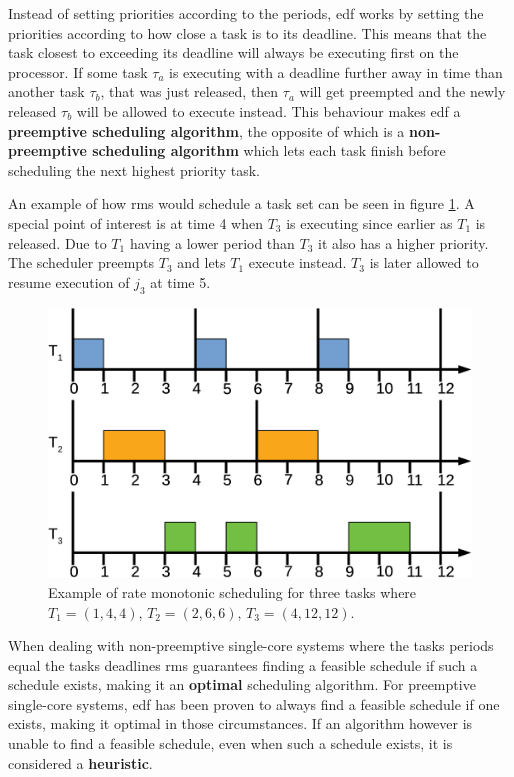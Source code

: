 \documentclass{kththesis}
\begin{document}
Instead of setting priorities according to the periods, \acrshort{edf} works by setting the
priorities according to how close a task is to its deadline. This means that the task closest to
exceeding its deadline will always be executing first on the processor. If some task $ \tau_a $ is
executing with a deadline further away in time than another task $ \tau_b $, that was just released,
then $ \tau_a $ will get preempted and the newly released $ \tau_b $ will be allowed to execute
instead. This behaviour makes \acrshort{edf} a \textbf{preemptive scheduling algorithm}, the
opposite of which is a \textbf{non-preemptive scheduling algorithm} which lets each task finish
before scheduling the next highest priority task.

An example of how \acrshort{rms} would schedule a task set can be seen in figure
\ref{fig:rate_monotonic_scheduling}. A special point of interest is at time 4 when $T_3$ is
executing since earlier as $T_1$ is released. Due to $T_1$ having a lower period than $T_3$ it also
has a higher priority. The scheduler preempts $T_3$ and lets $T_1$ execute instead. $T_3$ is later
allowed to resume execution of $j_3$ at time 5.

\begin{figure}

    \centering

    \includegraphics[width=0.8\linewidth]{images/rate-monotonic-scheduling.pdf}

    \caption{Example of rate monotonic scheduling for three tasks where $T_1=(1, 4, 4)$, $T_2=(2, 6,
    6)$, $T_3=(4, 12, 12)$.}

    \label{fig:rate_monotonic_scheduling}

\end{figure}

When dealing with non-preemptive single-core systems where the tasks periods equal the tasks
deadlines \acrshort{rms} guarantees finding a feasible schedule if such a schedule exists, making it
an \textbf{optimal} scheduling algorithm. For preemptive single-core systems, \acrshort{edf} has
been proven to always find a feasible schedule if one exists, making it optimal in those
circumstances. If an algorithm however is unable to find a feasible schedule, even when such a
schedule exists, it is considered a \textbf{heuristic}.
\end{document}
